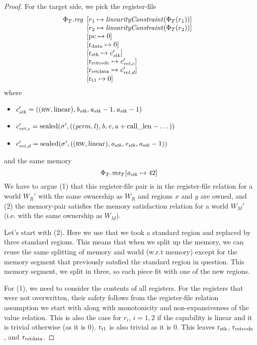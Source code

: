 \documentclass[a4paper]{article}
\begin{document}
\begin{proof}
For the target side, we pick the register-file
\[
  \Phi_T.\reg
  \begin{array}[t]{l}
    \update{r_1}{\linCons{\Phi_T(r_1)}}\\
    \update{r_2}{\linCons{\Phi_T(r_2)}}\\
    \update{\pcreg}{0} \\
    \update{\rdata}{0} \\
    \update{\rstk}{c_\stk'}\\
    \update{\rretc}{c_{\ret,c}'}\\
    \update{\rretd}{c_{\ret,d}'}\\
    \update{\rtmp{1}}{0}\\
  \end{array}  
\]
where
\begin{itemize}
\item $c_{\mathit{stk}}' = ((\textsc{rw},\mathrm{linear}),\mathit{b}_{\mathit{stk}},\mathit{a}_{\mathit{stk}}-1,\mathit{a}_{\mathit{stk}}-1)$
\item $c_{\mathit{ret},c}' = \mathrm{sealed}(\sigma',((\mathit{perm},\mathit{l}),\mathit{b},\mathit{e},\mathit{a}+\mathrm{call\_len}-\dots))$
\item $c_{\mathit{ret},d}' = \mathrm{sealed}(\sigma',((\textsc{rw},\mathrm{linear}),\mathit{a}_{\mathit{stk}},\mathit{e}_{\mathit{stk}},\mathit{a}_{\mathit{stk}}-1))$
\end{itemize}
and the same memory
\[
  \Phi_T.\mathit{ms}_T[\mathit{a}_{\mathit{stk}} \mapsto 42]
\]
We have to argue (1) that this register-file pair is in the register-file relation for a world $W_R'$ with the same ownership as $W_R$ and regions $x$ and $y$ are owned, and (2) the memory-pair satisfies the memory satisfaction relation for a world $W_M'$ (i.e. with the same ownership as $W_M$).
 
Let's start with (2). Here we use that we took a standard region and replaced by three standard regions. This means that when we split up the memory, we can reuse the same splitting of memory and world (w.r.t memory) except for the memory segment that previously satsfied the standard region in question. This memory segment, we split in three, so each piece fit with one of the new regions.

For (1), we need to consider the contents of all registers. For the registers that were not overwritten, their safety follows from the register-file relation assumption we start with along with monotonicity and non-expansiveness of the value relation. This is also the case for $r_i$, $i=1,2$ if the capability is linear and it is trivial otherwise (as it is $0$). $\mathrm{r}_\mathrm{t1}$ is also trivial as it is $0$. This leaves $\mathrm{r}_\mathrm{stk}$, $\mathrm{r}_\mathrm{ret code}$, and $\mathrm{r}_\mathrm{ret data}$.


\end{proof}
\end{document}
